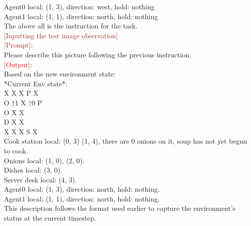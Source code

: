 \documentclass[11pt]{article}
\theoremstyle{plain}
\theoremstyle{remark}
\newcommand{\blank}[1]{\textcolor{brown}{#1}}
\begin{document}
{Agent0 local: (1, 3), direction: west, hold: nothing\\
Agent1 local: (1, 1), direction: north, hold: nothing\\
The above all is the instruction for the task.\\
\blank{[Inputting the test image observation]} \\
\blank{[Prompt]}: \\
Please describe this picture following the previous instruction.\\
\textcolor{red}{[Output]}: \\
Based on the new environment state:\\
*Current Env state*:\\
X       X        X       P        X\\
O       ↑1      X       ↑0      P\\
O       \hspace{1em}         X     \hspace{1em}           X\\
D         \hspace{1em}       X       \hspace{1em}         X\\
X       X        X       S        X\\
Cook station local: (0, 3) (1, 4), there are 0 onions on it, soup has not yet begun to cook.\\
Onions local: (1, 0), (2, 0).\\
Dishes local: (3, 0).\\
Server desk local: (4, 3).\\
Agent0 local: (1, 3), direction: north, hold: nothing.\\
Agent1 local: (1, 1), direction: north, hold: nothing.\\
This description follows the format used earlier to capture the environment's status at the current timestep.
}
\end{document}

